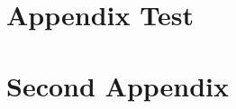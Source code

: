 
\begin{appendicesmulti}

\chapter{Appendix Test}
\lipsum

\chapter{Second Appendix}
\lipsum




\end{appendicesmulti}